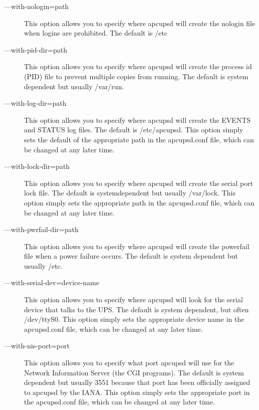 \begin{description}
\item [{---}with-nologin=\lt{}path\gt{}]
   This option allows you to specify where apcupsd will create the nologin file
when logins are prohibited. The default is /etc  

\item [{---}with-pid-dir=\lt{}path\gt{}]
   This option allows you to specify where apcupsd will create the process id
(PID) file to prevent multiple copies from running. The default is system
dependent but usually /var/run.  

\item [{---}with-log-dir=\lt{}path\gt{}]
   This option allows you to specify where apcupsd will create the EVENTS and
STATUS log files. The default is /etc/apcupsd. This option simply sets the
default of the appropriate path in the apcupsd.conf file, which can be changed
at any later time.  

\item [{---}with-lock-dir=\lt{}path\gt{}]
   This option allows you to specify where apcupsd will create the serial port
lock file. The default is systemdependent but usually /var/lock. This option
simply sets the appropriate path in the apcupsd.conf file, which can be
changed at any later time.  

\item [{---}with-pwrfail-dir=\lt{}path\gt{}]
   This option allows you to specify where apcupsd will create the powerfail file
when a power failure occurs. The default is system dependent but usually /etc.
 

\item [{---}with-serial-dev=\lt{}device-name\gt{}]
   This option allows you to specify where apcupsd will look for the serial
device that talks to the UPS. The default is system dependent, but often
/dev/ttyS0. This option simply sets the appropriate device name in the
apcupsd.conf file, which can be changed at any later time.  

\item [{---}with-nis-port=\lt{}port\gt{}]
   This option allows you to specify what port apcupsd will use for the Network
Information Server (the CGI programs). The default is system dependent but
usually 3551 because that port has been officially assigned to apcupsd by the
IANA. This option simply sets the appropriate port in the apcupsd.conf file,
which can be changed at any later time.  


\end{description}
